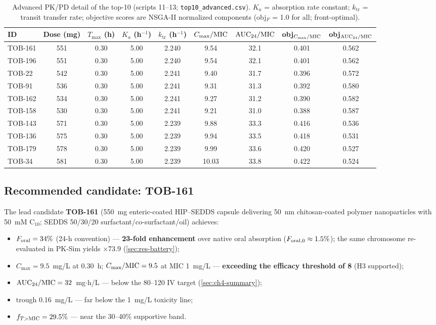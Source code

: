 \begin{table}[htbp]
\centering
\caption{Advanced PK/PD detail of the top-10 (scripts 11--13; \texttt{top10\_advanced.csv}). $K_a$ = absorption rate constant; $k_{\mathrm{tr}}$ = transit transfer rate; objective scores are NSGA-II normalized components (obj$_F$ = 1.0 for all; front-optimal).}
\label{tab:top10-advanced}
\footnotesize\setlength{\tabcolsep}{2.6pt}
\begin{tabular}{lcccccccc}
\toprule
ID & Dose (mg) & $T_{\max}$ (h) & $K_a$ (h$^{-1}$) & $k_{\mathrm{tr}}$ (h$^{-1}$) & $C_{\max}/\mathrm{MIC}$ & $\mathrm{AUC}_{24}/\mathrm{MIC}$ & obj$_{C_{\max}/\mathrm{MIC}}$ & obj$_{\mathrm{AUC}_{24}/\mathrm{MIC}}$\\
\midrule
TOB-161 & 551 & 0.30 & 5.00 & 2.240 & 9.54 & 32.1 & 0.401 & 0.562\\
TOB-196 & 551 & 0.30 & 5.00 & 2.240 & 9.54 & 32.1 & 0.401 & 0.562\\
TOB-22  & 542 & 0.30 & 5.00 & 2.241 & 9.40 & 31.7 & 0.396 & 0.572\\
TOB-91  & 536 & 0.30 & 5.00 & 2.241 & 9.31 & 31.3 & 0.392 & 0.580\\
TOB-162 & 534 & 0.30 & 5.00 & 2.241 & 9.27 & 31.2 & 0.390 & 0.582\\
TOB-158 & 530 & 0.30 & 5.00 & 2.241 & 9.21 & 31.0 & 0.388 & 0.587\\
TOB-143 & 571 & 0.30 & 5.00 & 2.239 & 9.88 & 33.3 & 0.416 & 0.536\\
TOB-136 & 575 & 0.30 & 5.00 & 2.239 & 9.94 & 33.5 & 0.418 & 0.531\\
TOB-179 & 578 & 0.30 & 5.00 & 2.239 & 9.99 & 33.6 & 0.420 & 0.527\\
TOB-34  & 581 & 0.30 & 5.00 & 2.239 & 10.03 & 33.8 & 0.422 & 0.524\\
\bottomrule
\end{tabular}
\end{table}

\subsection{Recommended candidate: TOB-161}
The lead candidate \textbf{TOB-161} (550~mg enteric-coated HIP--SEDDS capsule delivering 50~nm chitosan-coated polymer nanoparticles with 50~mM C$_{10}$; SEDDS 50/30/20 surfactant/co-surfactant/oil) achieves:
\begin{itemize}
\item $F_{\mathrm{oral}} = 34\%$ (24-h convention) --- \textbf{23-fold enhancement} over native oral absorption ($F_{\mathrm{oral},0} \approx 1.5\%$); the same chromosome re-evaluated in PK-Sim yields $\times$73.9 (\cref{sec:res-battery});
\item $C_{\max} = 9.5$~mg/L at 0.30~h; $C_{\max}/\mathrm{MIC} = 9.5$ at MIC 1~mg/L --- \textbf{exceeding the efficacy threshold of 8} (H3 supported);
\item $\mathrm{AUC}_{24}/\mathrm{MIC} = 32$~mg$\cdot$h/L --- below the 80--120 IV target (\cref{sec:ch4-summary});
\item trough 0.16~mg/L --- far below the 1~mg/L toxicity line;
\item $f_{T>\mathrm{MIC}} = 29.5\%$ --- near the 30--40\% supportive band.
\end{itemize}

